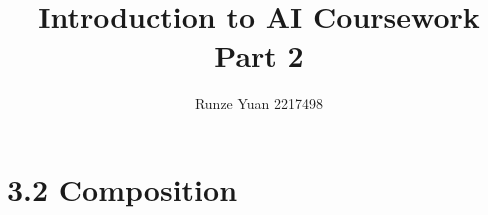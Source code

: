 \documentclass[a4paper,12pt]{article}
\title{Introduction to AI Coursework Part 2}
\author{Runze Yuan 2217498}
\begin{document}
\maketitle

\section*{3.2 Composition}

\begin{comment}
数据集创建者应该在任何数据收集之前通读这些问题，然后在数据收集完成后提供答案。
本节中的大部分问题旨在为数据集的消费者提供他们所需的信息，
以便就使用数据集完成他们所选择的任务做出明智的决定。
一些问题旨在获得有关遵守欧盟《通用数据保护条例》（GDPR）或其他司法管辖区的类似法规的信息。 
只适用于与人有关的数据集的问题在本节末尾归类。
我们建议对一个数据集是否与人有关进行广泛的解释。
例如，任何包含由人撰写的文本的数据集都与人有关。
\end{comment}
\end{document}
